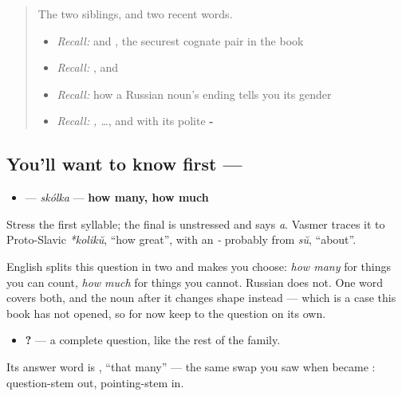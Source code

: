 \label{lesson:RU-C22-skolko}



\begin{quote}
The two siblings, and two recent words.

\begin{itemize}
\raggedright
  \item \emph{Recall:} \emph{} and \emph{}, the securest cognate pair in the book
  \item \emph{Recall:} \emph{}, and \emph{}
  \item \emph{Recall:} how a Russian noun's ending tells you its gender
  \item \emph{Recall:} \emph{ ,  …}, and \emph{} with its polite \textbf{-}
\end{itemize}
\end{quote}

\subsection*{You'll want to know first — }
\begin{itemize}
\raggedright
  \item \textbf{} — \emph{skólka} — \textbf{how many, how much}
\end{itemize}

Stress the first syllable; the final \textbf{} is unstressed and says \emph{a}. Vasmer traces it to Proto-Slavic \emph{*kolikŭ}, \textquotedblleft{}how great\textquotedblright{}, with an \emph{-} probably from \emph{sŭ}, \textquotedblleft{}about\textquotedblright{}.

English splits this question in two and makes you choose: \emph{how many} for things you can count, \emph{how much} for things you cannot. Russian does not. One word covers both, and the noun after it changes shape instead — which is a case this book has not opened, so for now keep to the question on its own.

\begin{itemize}
\raggedright
  \item \textbf{?} — a complete question, like the rest of the family.
\end{itemize}

Its answer word is \textbf{}, \textquotedblleft{}that many\textquotedblright{} — the same swap you saw when \textbf{} became \textbf{}: question-stem out, pointing-stem in.


